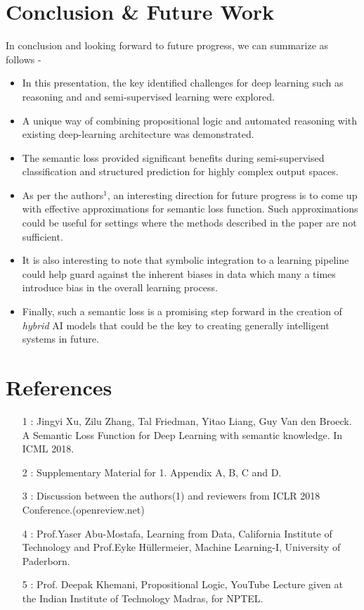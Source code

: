 \documentclass[12pt]{article}
\begin{document}
\section{Conclusion \& Future Work}
In conclusion and looking forward to future progress, we can summarize as follows - 
\begin{itemize}
    \item In this presentation, the key identified challenges for deep learning such as reasoning and  and semi-supervised learning were explored.
    \item A unique way of combining propositional logic and automated reasoning with existing deep-learning architecture was demonstrated.
    \item The semantic loss provided significant benefits during semi-supervised classification and structured prediction for highly complex output spaces.
    \item As per the authors$^1$, an interesting direction for future progress is to come up with effective approximations for semantic loss function. Such approximations could be useful for settings where the methods described in the paper are not sufficient.
    \item It is also interesting to note that symbolic integration to a learning pipeline could help guard against the inherent biases in data which many a times introduce bias in the overall learning process. \item Finally, such a semantic loss is a promising step forward in the creation of \textit{hybrid} AI models that could be the key to creating generally intelligent systems in future.
\end{itemize}

\section*{References}

\begin{itemize}
    \item [1]: Jingyi Xu, Zilu Zhang, Tal Friedman, Yitao Liang, Guy Van den Broeck. A Semantic Loss Function for Deep Learning with semantic knowledge. In ICML 2018. 
    \item [2]: Supplementary Material for 1. Appendix A, B, C and D.
    \item [3]: Discussion between the authors(1) and reviewers from ICLR 2018 Conference.(openreview.net)
    \item [4]: Prof.Yaser Abu-Mostafa, Learning from Data, California Institute of Technology and Prof.Eyke Hüllermeier, Machine Learning-I, University of Paderborn.
    \item [5]: Prof. Deepak Khemani, Propositional Logic, YouTube Lecture given at the Indian Institute of Technology Madras, for NPTEL.
\end{itemize}
\end{document}
